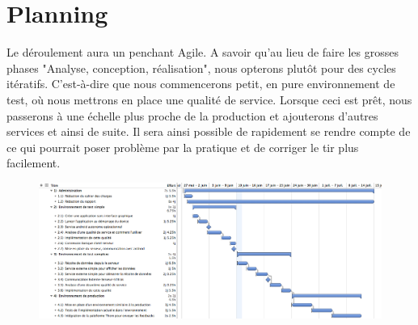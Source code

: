 
\chapter{Planning}
Le déroulement aura un penchant Agile. A savoir qu'au lieu de faire les grosses phases "Analyse, conception, réalisation", nous opterons plutôt pour des cycles itératifs. C'est-à-dire que nous commencerons petit, en pure environnement de test, où nous mettrons en place une qualité de service. Lorsque ceci est prêt, nous passerons à une échelle plus proche de la production et ajouterons d'autres services et ainsi de suite. Il sera ainsi possible de rapidement se rendre compte de ce qui pourrait poser problème par la pratique et de corriger le tir plus facilement.

\begin{figure}[H]
    \begin{center}
        \centering \includegraphics[width=1.5\linewidth, angle=90]{CDC/planning_bachelor_v2}
    \end{center}
\end{figure}
